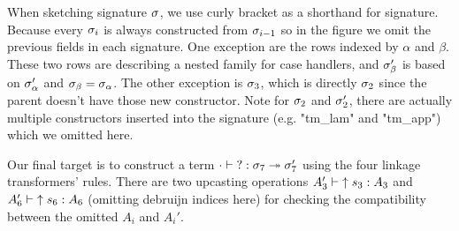 When sketching signature $\sigma$, we use curly bracket as a shorthand for signature. Because every $\sigma_i$ is always constructed from $\sigma_{i-1}$ so in the figure we omit the previous fields in each signature.  One exception are the rows indexed by $\alpha$ and $\beta$. These two rows are describing a nested family for case handlers, and $\sigma_\beta'$ is based on $\sigma_\alpha'$ and $\sigma_\beta = \sigma_\alpha$. The other exception is $\sigma_3$, which is directly $\sigma_2$ since the parent doesn't have those new constructor. Note for $\sigma_2$ and $\sigma_2'$, there are actually multiple constructors inserted into the signature (e.g. "tm_lam" and "tm_app") which we omitted here.


Our final target is to construct a term $ {\cdot} \vdash {?} : {\sigma_7} \twoheadrightarrow {\ensuremath{\sigma}_7'}$ using the four linkage transformers' rules. There are two upcasting operations $ {A_3'} \vdash {\uparrow s_3} : {A_3} $ and $ {A_6'} \vdash {\uparrow s_6} : {A_6} $ (omitting debruijn indices here) for checking the compatibility between the omitted $A_i$ and $A_i'$.
